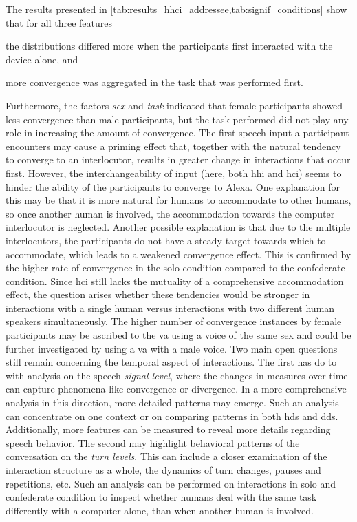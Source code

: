 The results presented in \cref{tab:results_hhci_addressee,tab:signif_conditions} show that for all three features
\begin{enumerate*}[(a)]
	\item the distributions differed more when the participants first interacted with the device alone, and
	\item more convergence was aggregated in the task that was performed first.
\end{enumerate*}
Furthermore, the factors \emph{sex} and \emph{task} indicated that female participants showed less convergence than male participants, but the task performed did not play any role in increasing the amount of convergence.
The first speech input a participant encounters may cause a priming effect that, together with the natural tendency to converge to an interlocutor, results in greater change in interactions that occur first.
However, the interchangeability of input (here, both \ac{hhi} and \ac{hci}) seems to hinder the ability of the participants to converge to Alexa.
One explanation for this may be that it is more natural for humans to accommodate to other humans, so once another human is involved, the accommodation towards the computer interlocutor is neglected.
Another possible explanation is that due to the multiple interlocutors, the participants do not have a steady target towards which to accommodate, which leads to a weakened convergence effect.
This is confirmed by the higher rate of convergence in the solo condition compared to the confederate condition.
Since \ac{hci} still lacks the mutuality of a comprehensive accommodation effect, the question arises whether these tendencies would be stronger in interactions with a single human versus interactions with two different human speakers simultaneously.
The higher number of convergence instances by female participants may be ascribed to the \ac{va} using a voice of the same sex and could be further investigated by using a \ac{va} with a male voice.
Two main open questions still remain concerning the temporal aspect of interactions.
The first has do to with analysis on the speech \emph{signal level}, where the changes in measures over time can capture phenomena like convergence or divergence.
In a more comprehensive analysis in this direction, more detailed patterns may emerge.
Such an analysis can concentrate on one context or on comparing patterns in both \ac{hds} and \ac{dds}.
Additionally, more features can be measured to reveal more details regarding speech behavior.
The second may highlight behavioral patterns of the conversation on the \emph{turn levels}.
This can include a closer examination of the interaction structure as a whole, the dynamics of turn changes, pauses and repetitions, etc.
Such an analysis can be performed on interactions in solo and confederate condition to inspect whether humans deal with the same task differently with a computer alone, than when another human is involved.











